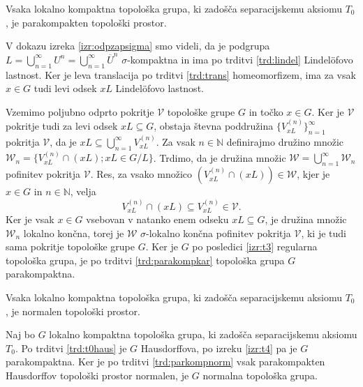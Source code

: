 \documentclass[mat1]{fmfdelo}
\newcommand{\N}{\mathbb N}
\newcommand{\closure}[1]{\overline{#1}}
\begin{document}
\begin{izrek}\label{izr:t4}
	Vsaka lokalno kompaktna topološka grupa, ki zadošča separacijskemu aksiomu $T_0$, je parakompakten topološki prostor.
\end{izrek}

\begin{dokaz}
V dokazu izreka \ref{izr:odpzapsigma} smo videli, da je podgrupa $L = \bigcup_{n = 1}^\infty U^n = \bigcup_{n = 1}^\infty \closure{U}^n$ $\sigma$-kompaktna in ima po trditvi \ref{trd:lindel} Lindel\"ofovo lastnost. Ker je leva translacija po trditvi \ref{trd:trans} homeomorfizem, ima za vsak $x \in G$ tudi levi odsek $xL$ Lindel\"ofovo lastnost.

Vzemimo poljubno odprto pokritje $\mathcal{V}$ topološke grupe $G$ in točko $x \in G$.
Ker je $\mathcal{V}$ pokritje tudi za levi odsek $xL \subseteq G$, obstaja števna poddružina $\lbrace V_{xL}^{(n)} \rbrace_{n = 1}^{\infty}$ pokritja $\mathcal{V}$, da je $xL \subseteq \bigcup_{n=1}^{\infty}V_{xL}^{(n)}$. Za vsak $n \in \N$ definirajmo družino množic $\mathcal{W}_n = \lbrace V_{xL}^{(n)} \cap (xL) ; xL \in G/L \rbrace$.
Trdimo, da je družina množic $\mathcal{W} = \bigcup_{n=1}^{\infty}\mathcal{W}_n$ pofinitev pokritja $\mathcal{V}$. Res, za vsako množico $(V_{xL}^{(n)} \cap (xL)) \in \mathcal{W}$, kjer je $x \in G$ in $n \in \N$, velja
\[ V_{xL}^{(n)} \cap (xL) \subseteq V_{xL}^{(n)} \in \mathcal{V}. \]
Ker je vsak $x \in G$ vsebovan v natanko enem odseku $xL \subseteq G$, je družina množic $\mathcal{W}_n$ lokalno končna, torej je $\mathcal{W}$ $\sigma$-lokalno končna pofinitev pokritja $\mathcal{V}$, ki je tudi sama pokritje topološke grupe $G$. Ker je $G$ po posledici \ref{izr:t3} regularna topološka grupa, je po trditvi \ref{trd:parakompkar} topološka grupa $G$ parakompaktna.
\end{dokaz}

\begin{posledica}
Vsaka lokalno kompaktna topološka grupa, ki zadošča separacijskemu aksiomu $T_0$, je normalen topološki prostor.
\end{posledica}

\begin{dokaz}
Naj bo $G$ lokalno kompaktna topološka grupa, ki zadošča separacijskemu aksiomu $T_0$. Po trditvi \ref{trd:t0haus} je $G$ Hausdorffova, po izreku \ref{izr:t4} pa je $G$ parakompaktna. Ker je po trditvi \ref{trd:parkompnorm} vsak parakompakten Hausdorffov topološki prostor normalen, je $G$ normalna topološka grupa.
\end{dokaz}
\end{document}
